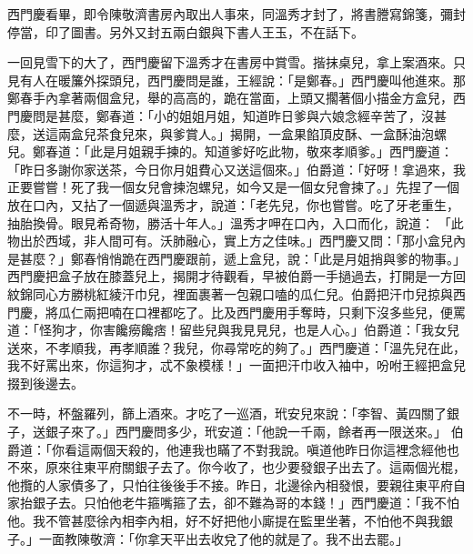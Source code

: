西門慶看畢，即令陳敬濟書房內取出人事來，同溫秀才封了，將書謄寫錦箋，彌封停當，印了圖書。另外又封五兩白銀與下書人王玉，不在話下。

一回見雪下的大了，西門慶留下溫秀才在書房中賞雪。揩抹桌兒，拿上案酒來。只見有人在暖簾外探頭兒，西門慶問是誰，王經說：「是鄭春。」西門慶叫他進來。那鄭春手內拿著兩個盒兒，舉的高高的，跪在當面，上頭又擱著個小描金方盒兒，西門慶問是甚麼，鄭春道：「小的姐姐月姐，知道昨日爹與六娘念經辛苦了，沒甚麼，送這兩盒兒茶食兒來，與爹賞人。」揭開，一盒果餡頂皮酥、一盒酥油泡螺兒。鄭春道：「此是月姐親手揀的。知道爹好吃此物，敬來孝順爹。」西門慶道： 「昨日多謝你家送茶，今日你月姐費心又送這個來。」伯爵道：「好呀！拿過來，我正要嘗嘗！死了我一個女兒會揀泡螺兒，如今又是一個女兒會揀了。」先捏了一個放在口內，又拈了一個遞與溫秀才，說道：「老先兒，你也嘗嘗。吃了牙老重生，抽胎換骨。眼見希奇物，勝活十年人。」溫秀才呷在口內，入口而化，說道： 「此物出於西域，非人間可有。沃肺融心，實上方之佳味。」西門慶又問：「那小盒兒內是甚麼？」鄭春悄悄跪在西門慶跟前，遞上盒兒，說：「此是月姐捎與爹的物事。」西門慶把盒子放在膝蓋兒上，揭開才待觀看，早被伯爵一手撾過去，打開是一方回紋錦同心方勝桃紅綾汗巾兒，裡面裹著一包親口嗑的瓜仁兒。伯爵把汗巾兒掠與西門慶，將瓜仁兩把喃在口裡都吃了。比及西門慶用手奪時，只剩下沒多些兒，便罵道：「怪狗才，你害饞癆饞痞！留些兒與我見見兒，也是人心。」伯爵道：「我女兒送來，不孝順我，再孝順誰？我兒，你尋常吃的夠了。」西門慶道：「溫先兒在此，我不好罵出來，你這狗才，忒不象模樣！」一面把汗巾收入袖中，吩咐王經把盒兒掇到後邊去。

不一時，杯盤羅列，篩上酒來。才吃了一巡酒，玳安兒來說：「李智、黃四關了銀子，送銀子來了。」西門慶問多少，玳安道：「他說一千兩，餘者再一限送來。」 伯爵道：「你看這兩個天殺的，他連我也瞞了不對我說。嗔道他昨日你這裡念經他也不來，原來往東平府關銀子去了。你今收了，也少要發銀子出去了。這兩個光棍，他攬的人家債多了，只怕往後後手不接。昨日，北邊徐內相發恨，要親往東平府自家抬銀子去。只怕他老牛箍嘴箍了去，卻不難為哥的本錢！」西門慶道：「我不怕他。我不管甚麼徐內相李內相，好不好把他小廝提在監里坐著，不怕他不與我銀子。」一面教陳敬濟：「你拿天平出去收兌了他的就是了。我不出去罷。」


